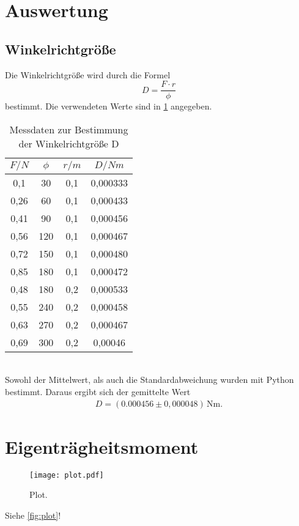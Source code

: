 \section{Auswertung}
\label{sec:Auswertung}
\subsection{Winkelrichtgröße}
Die Winkelrichtgröße wird durch die Formel
\begin{equation}
  D = \frac{F \cdot r}{\phi}
\end{equation}
bestimmt. Die verwendeten Werte sind in \ref{tab:winkelrichtgr} angegeben.
\begin{table}
  \centering
  \label{tab:winkelrichtgr}
  \caption{Messdaten zur Bestimmung der Winkelrichtgröße D}
  \begin{tabular}{c c c c}
    \toprule
    $F/N$ & $\phi$ & $r/m$ & $D/Nm$ \\
    \midrule
    0,1  &  30 & 0,1 & 0,000333\\
    0,26 &  60 & 0,1 & 0,000433\\
    0,41 &  90 & 0,1 & 0,000456\\
    0,56 & 120 & 0,1 & 0,000467\\
    0,72 & 150 & 0,1 & 0,000480\\
    0,85 & 180 & 0,1 & 0,000472\\
    0,48 & 180 & 0,2 & 0,000533\\
    0,55 & 240 & 0,2 & 0,000458\\
    0,63 & 270 & 0,2 & 0,000467\\
    0,69 & 300 & 0,2 & 0,00046\\
    \bottomrule
  \end{tabular}
\end{table}
\\Sowohl der Mittelwert, als auch die Standardabweichung wurden mit Python bestimmt. Daraus ergibt sich der
gemittelte Wert
\begin{align*}
    D = (0.000456 \pm 0{,}000048)\,\mathrm{Nm} .
\end{align*}

\section{Eigenträgheitsmoment}
\begin{figure}
  \centering
  \texttt{[image: plot.pdf]}
  \caption{Plot.}
  \label{fig:plot}
\end{figure}



Siehe \autoref{fig:plot}!
